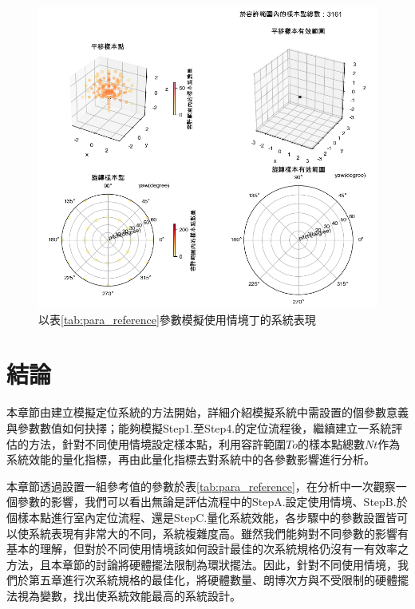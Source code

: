 \begin{figure}[htpb]
    \centering
    \includegraphics[width=15cm]{ch4pic/scene_d_solve.png}
    \caption{以表\ref{tab:para_reference}參數模擬使用情境丁的系統表現}
    \label{pic:scenario_d_solve}
\end{figure}



\section{結論}
\label{chp:4_conclusion}

本章節由建立模擬定位系統的方法開始，詳細介紹模擬系統中需設置的個參數意義與參數數值如何抉擇；能夠模擬Step1.至Step4.的定位流程後，繼續建立一系統評估的方法，針對不同使用情境設定樣本點，利用容許範圍$To$的樣本點總數$Nt$作為系統效能的量化指標，再由此量化指標去對系統中的各參數影響進行分析。

本章節透過設置一組參考值的參數於表\ref{tab:para_reference}，在分析中一次觀察一個參數的影響，我們可以看出無論是評估流程中的StepA.設定使用情境、StepB.於個樣本點進行室內定位流程、還是StepC.量化系統效能，各步驟中的參數設置皆可以使系統表現有非常大的不同，系統複雜度高。雖然我們能夠對不同參數的影響有基本的理解，但對於不同使用情境該如何設計最佳的次系統規格仍沒有一有效率之方法，且本章節的討論將硬體擺法限制為環狀擺法。因此，針對不同使用情境，我們於第五章進行次系統規格的最佳化，將硬體數量、朗博次方與不受限制的硬體擺法視為變數，找出使系統效能最高的系統設計。

